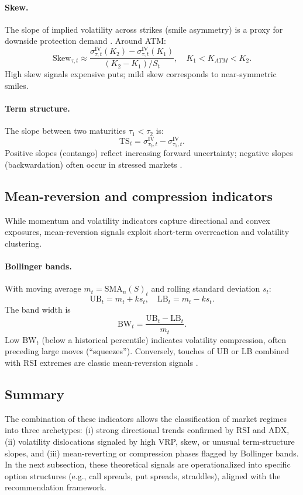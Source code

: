 \documentclass[12pt,a4paper]{report}
\begin{document}
\paragraph{Skew.}  
The slope of implied volatility across strikes (smile asymmetry) is a proxy for downside protection demand \citep{bollen2004does}. Around ATM:
\[
\text{Skew}_{\tau,t} \approx \frac{\sigma^{\text{IV}}_{\tau,t}(K_2)-\sigma^{\text{IV}}_{\tau,t}(K_1)}{(K_2-K_1)/S_t}, \quad K_1<K_{ATM}<K_2.
\]
High skew signals expensive puts; mild skew corresponds to near-symmetric smiles.

\paragraph{Term structure.}  
The slope between two maturities $\tau_1<\tau_2$ is:
\[
\text{TS}_t=\sigma^{\text{IV}}_{\tau_2,t}-\sigma^{\text{IV}}_{\tau_1,t}.
\]
Positive slopes (contango) reflect increasing forward uncertainty; negative slopes (backwardation) often occur in stressed markets \citep{christoffersen2009shape}.

\subsection{Mean-reversion and compression indicators}

While momentum and volatility indicators capture directional and convex exposures, mean-reversion signals exploit short-term overreaction and volatility clustering.

\paragraph{Bollinger bands.}  
With moving average $m_t=\text{SMA}_n(S)_t$ and rolling standard deviation $s_t$:
\[
\text{UB}_t=m_t+ks_t, \quad \text{LB}_t=m_t-ks_t.
\]
The band width is
\[
\text{BW}_t=\frac{\text{UB}_t-\text{LB}_t}{m_t}.
\]
Low $\text{BW}_t$ (below a historical percentile) indicates volatility compression, often preceding large moves (``squeezes''). Conversely, touches of UB or LB combined with RSI extremes are classic mean-reversion signals \citep{brock1992simple}.

\subsection{Summary}

The combination of these indicators allows the classification of market regimes into three archetypes: (i) strong directional trends confirmed by RSI and ADX, (ii) volatility dislocations signaled by high VRP, skew, or unusual term-structure slopes, and (iii) mean-reverting or compression phases flagged by Bollinger bands. In the next subsection, these theoretical signals are operationalized into specific option structures (e.g., call spreads, put spreads, straddles), aligned with the recommendation framework.
\end{document}
